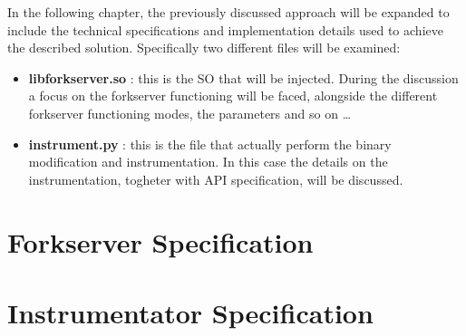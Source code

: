 In the following chapter, the previously discussed approach will be expanded to include the technical 
specifications and implementation details used to achieve the described solution.
Specifically two different files will be examined:
\begin{itemize}
    \item \textbf{libforkserver.so} : this is the \gls{SO} that will be injected. During the discussion a focus on the 
        forkserver functioning will be faced, alongside the different forkserver functioning modes, the parameters and so on \dots
    \item \textbf{instrument.py} : this is the file that actually perform the binary modification and instrumentation.
        In this case the details on the instrumentation, togheter with API specification, will be discussed.
\end{itemize}

\section{Forkserver Specification} \label{sec:forksrv_spec}
    
\section{Instrumentator Specification} \label{sec:instrument_spec}
    